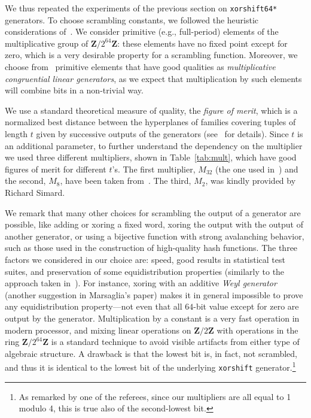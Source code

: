 \documentclass{acmsmalltr}
\newcommand{\Z}{\mathbf Z}
\newcommand{\xorshift}[1][]{\texttt{xorshift#1}\xspace}
\newcommand{\xorshifts}[1][]{\texttt{xorshift#1*}\xspace}
\begin{document}
\begin{table}
\end{table}

We thus repeated the experiments of the previous section on \xorshifts[64]
generators. To choose scrambling constants, we followed the heuristic
considerations of~\cite{PTVNR}. We consider primitive (e.g., full-period)
elements of the multiplicative group of $\Z/2^{64}\Z$: these elements have no
fixed point except for zero, which is a very desirable property for a scrambling function.
Moreover, we choose from~
primitive elements that have good qualities as \emph{multiplicative
congruential linear generators}, as we expect that multiplication by such
elements will combine bits in a non-trivial way. 

We use a standard theoretical measure of quality, the \emph{figure of
merit}, which is a normalized best distance between the hyperplanes of families
covering tuples of length $t$ given by successive outputs of the generators 
(see~ for details). Since $t$ is an additional parameter,
to further understand the dependency on the multiplier we used three different
multipliers, shown in Table~\ref{tab:mult}, which have good figures of
merit for different $t$'s. The first multiplier, $M_{32}$ (the
one used in~\cite{PTVNR}) and the second, $M_8$, have been taken
from~. The third, $M_2$, was kindly provided by Richard
Simard.

We remark that many other choices for scrambling the output of a generator are
possible, like adding or xoring a fixed word, xoring the output with the output
of another generator, or using a bijective function with strong avalanching
behavior, such as those used in the construction of high-quality hash
functions.
The three factors we considered in our choice are: speed,
good results in statistical test suites, and preservation of 
some equidistribution properties (similarly to the approach taken
in~\cite{LEGCGCDF}).
For instance, xoring with an additive \emph{Weyl generator} (another suggestion
in Marsaglia's paper) makes it in general impossible to prove any
equidistribution property---not even that all $64$-bit value except for zero are output by the
generator. Multiplication by a constant is a very fast operation in modern
processor, and mixing linear operations on $\Z/2\Z$ with operations in
the ring $\Z/2^{64}\Z$ is a standard technique to avoid visible artifacts from
either type of algebraic structure. A drawback is that the lowest bit is, in
fact, not scrambled, and thus it is identical to the lowest bit of
the underlying \xorshift generator.\footnote{As remarked by one of the referees,
since our multipliers are all equal to 1 modulo 4, this is true also of the
second-lowest bit.}
\end{document}
